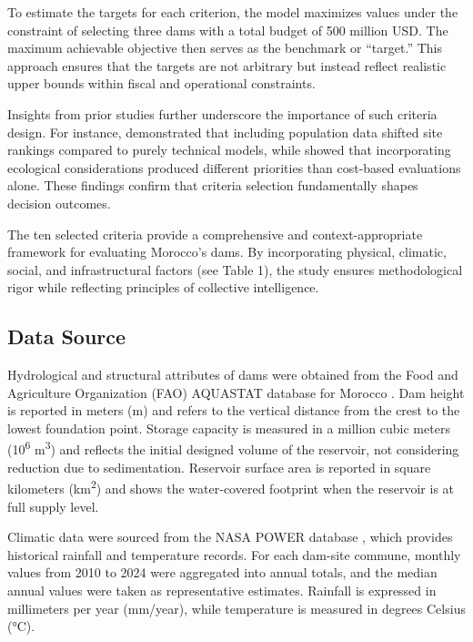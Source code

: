 To estimate the targets for each criterion, the model maximizes values under the constraint of selecting three dams with a total budget of 500 million USD. The maximum achievable objective then serves as the benchmark or “target.” This approach ensures that the targets are not arbitrary but instead reflect realistic upper bounds within fiscal and operational constraints.

Insights from prior studies further underscore the importance of such criteria design. For instance,\cite{Rana2020} demonstrated that including population data shifted site rankings compared to purely technical models, while \cite{TEMEL2023159152} showed that incorporating ecological considerations produced different priorities than cost-based evaluations alone. These findings confirm that criteria selection fundamentally shapes decision outcomes.

The ten selected criteria provide a comprehensive and context-appropriate framework for evaluating Morocco’s dams. By incorporating physical, climatic, social, and infrastructural factors (see Table 1), the study ensures methodological rigor while reflecting principles of collective intelligence.

\subsection{Data Source}
Hydrological and structural attributes of dams were obtained from the Food and Agriculture Organization (FAO) AQUASTAT database for Morocco \cite{FAO_AQUASTAT_MAR}. Dam height is reported in meters (m) and refers to the vertical distance from the crest to the lowest foundation point. Storage capacity is measured in a million cubic meters (10\textsuperscript{6} m\textsuperscript{3}) and reflects the initial designed volume of the reservoir, not considering reduction due to sedimentation. Reservoir surface area is reported in square kilometers (km\textsuperscript{2}) and shows the water-covered footprint when the reservoir is at full supply level.

Climatic data were sourced from the NASA POWER database \cite{NASA_POWER_API}, which provides historical rainfall and temperature records. For each dam-site commune, monthly values from 2010 to 2024 were aggregated into annual totals, and the median annual values were taken as representative estimates. Rainfall is expressed in millimeters per year (mm/year), while temperature is measured in degrees Celsius (°C).

